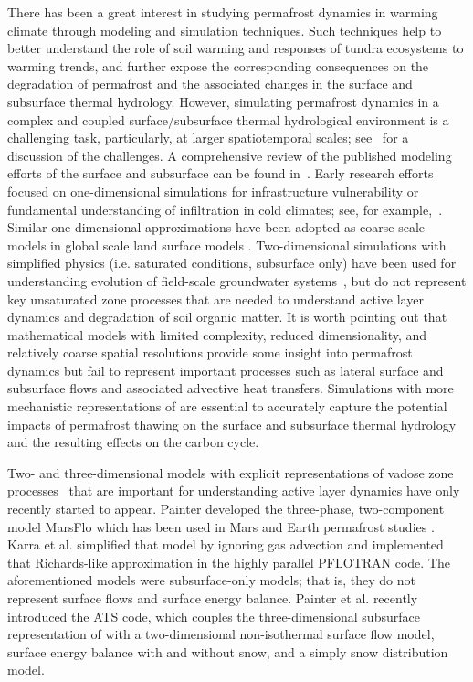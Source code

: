 \documentclass[review]{elsarticle}
\begin{document}
There has been a great interest in studying permafrost dynamics in warming climate through modeling and simulation techniques. Such techniques help to better understand the role of soil warming and responses of tundra ecosystems to warming trends, and further expose the corresponding consequences on the degradation of permafrost and the associated changes in the surface and subsurface thermal hydrology. However, simulating permafrost dynamics in a complex and coupled surface/subsurface thermal hydrological environment is a challenging task, particularly, at larger spatiotemporal scales; see~\cite{painter2013modeling} for a discussion of the challenges.  A comprehensive review of the published modeling efforts of the surface and subsurface can be found in~\cite{kurylyk2014climate}. Early research efforts focused on one-dimensional simulations for infrastructure vulnerability or fundamental understanding of infiltration in cold climates; see, for example,~\cite{harlan1973analysis, guymon1974coupled, taylor1978model}. Similar one-dimensional approximations have been adopted as coarse-scale models in global scale land surface models \cite{takata2003development, nicolsky2007improved, lawrence2012simulation, koven2013analysis}.  Two-dimensional simulations with simplified physics (i.e. saturated conditions, subsurface only) have been used for understanding evolution of field-scale groundwater systems~\cite{mckenzie2007groundwater, bense2009evolution}, but do not represent key unsaturated zone processes that are needed to understand active layer dynamics and degradation of soil organic matter.   It is worth pointing out that mathematical models with limited complexity, reduced dimensionality, and relatively coarse spatial resolutions provide some insight into permafrost dynamics but fail to represent important processes such as lateral surface and subsurface flows and associated advective heat transfers. Simulations with more mechanistic representations of are essential to accurately capture the potential impacts of permafrost thawing on the surface and subsurface thermal hydrology and the resulting effects on the carbon cycle. 

Two- and three-dimensional models with explicit representations of vadose zone processes~\cite{painter2014} that are important for understanding active layer dynamics have only recently started to appear. Painter \citeyear{painter2011} developed the three-phase, two-component model MarsFlo which has been used in Mars \cite{grimm} and Earth permafrost studies \cite{frampton}.  Karra et al. \citeyear{karra3d} simplified that model by ignoring gas advection and implemented that Richards-like approximation in the highly parallel PFLOTRAN \cite{pflotran} code. The aforementioned models were subsurface-only models; that is, they do not represent surface flows and surface energy balance. Painter et al. \citeyear{2016} recently introduced the ATS code, which couples the three-dimensional subsurface representation of \cite{karra3d} with a two-dimensional non-isothermal surface flow model, surface energy balance with and without snow, and a simply snow distribution model. 
\end{document}
